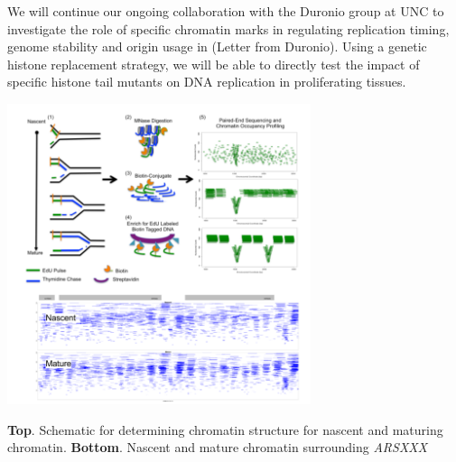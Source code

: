 We will continue our ongoing collaboration with the Duronio group at UNC to investigate the role of specific chromatin marks in regulating replication timing, genome stability and origin usage in \dros\citep{Li2016-fi}(Letter from Duronio). Using a genetic histone replacement strategy\citep{McKay2015-nn}, we will be able to directly test the impact of specific histone tail mutants on DNA replication in proliferating tissues. %
\begin{floatingfigure}[l]{3.5in}
\vspace{-8mm}
\begin{center}
\includegraphics[width=3.5in]{r35_figures/chromatin_maturation_mpg_3.png}
\end{center}
\vspace{1mm}
\caption{{\bfseries \sffamily Top}. Schematic for determining chromatin structure for nascent and maturing chromatin. {\bfseries \sffamily Bottom}. Nascent and mature chromatin surrounding \textit{ARSXXX}}%
\end{floatingfigure}


